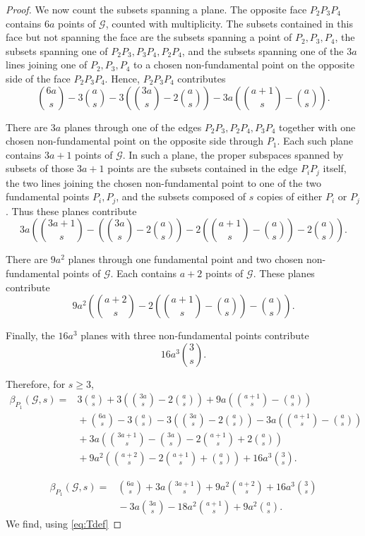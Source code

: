\documentclass{article}
\newcommand{\Gscr}{\mathscr{G}}
\begin{document}
\begin{proof}
We now count the subsets spanning a plane. The opposite face $P_2P_3P_4$
contains $6a$ points of $\Gscr$, counted with multiplicity. The subsets
contained in this face but not spanning the face are the subsets spanning a point of
 $P_2,P_3,P_4$, the subsets spanning one of $P_2P_3,P_3P_4,P_2P_4$,
and the subsets spanning one of the $3a$ lines joining one of $P_2,P_3,P_4$ to a chosen
non-fundamental point on the opposite side of the face $P_2P_3P_4$. Hence, $P_2P_3P_4$
contributes
\[
\binom{6a}{s}
-3\binom{a}{s}
-3\left(\binom{3a}{s}-2\binom{a}{s}\right)
-3a\left(\binom{a+1}{s}-\binom{a}{s}\right).
\]

There are $3a$ planes through one of the edges
$P_2P_3,P_2P_4,P_3P_4$ together with one chosen non-fundamental point on the
opposite side through $P_1$. Each such plane contains $3a+1$ points of
$\Gscr$. In such a plane, the proper subspaces spanned by subsets of those $3a+1$ points are the subsets contained in the edge $P_iP_j$ itself, the two lines joining the chosen non-fundamental point to one of the two fundamental points $P_i,P_j$, and the subsets composed of $s$ copies of either $P_i$ or $P_j$. Thus these planes contribute
\[
3a\left(
\binom{3a+1}{s}
-\left(\binom{3a}{s}-2\binom{a}{s}\right)
-2\left(\binom{a+1}{s}-\binom{a}{s}\right)-2\binom{a}{s}
\right).
\]


There are $9a^2$ planes through one fundamental point and two chosen
non-fundamental points of $\Gscr$. Each contains $a+2$ points of $\Gscr$.
These
planes contribute
\[
9a^2\left(
\binom{a+2}{s}
-2\left(\binom{a+1}{s}-\binom{a}{s}\right)-\binom{a}{s}
\right).
\]


Finally, the $16a^3$ planes with three non-fundamental points contribute
\[
16a^3\binom{3}{s}.
\]

Therefore, for $s\geq 3$,
\[
\begin{aligned}
\beta_{P_1}(\Gscr,s)
={}&
3\binom{a}{s}
+3\left(\binom{3a}{s}-2\binom{a}{s}\right)
+9a\left(\binom{a+1}{s}-\binom{a}{s}\right)\\
&{}+\binom{6a}{s}
-3\binom{a}{s}
-3\left(\binom{3a}{s}-2\binom{a}{s}\right)
-3a\left(\binom{a+1}{s}-\binom{a}{s}\right)\\
&{}+3a\left(
\binom{3a+1}{s}
-\binom{3a}{s}
-2\binom{a+1}{s}
+2\binom{a}{s}
\right)\\
&{}+9a^2\left(
\binom{a+2}{s}
-2\binom{a+1}{s}
+\binom{a}{s}
\right)
+16a^3\binom{3}{s}.
\end{aligned}
\]


\[
\begin{aligned}
\beta_{P_1}(\Gscr,s)
={}&
\binom{6a}{s}
+3a\binom{3a+1}{s}
+9a^2\binom{a+2}{s}
+16a^3\binom{3}{s}\\
&{}-3a\binom{3a}{s}
-18a^2\binom{a+1}{s}
+9a^2\binom{a}{s}.
\end{aligned}
\]
We find, using \eqref{eq:Tdef}


\end{proof}
\end{document}

